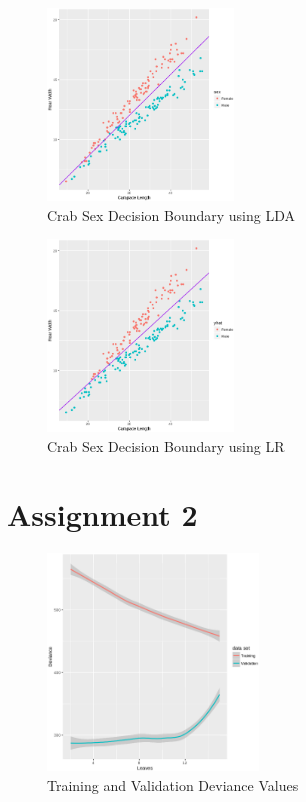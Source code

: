 \documentclass[a4paper, twocolumn]{article}
\begin{document}
        \begin{figure}[h!]
            \centering
            \caption{Crab Sex Decision Boundary using LDA}
            \label{fig:boundarylda}
            \includegraphics[width=0.44\textwidth]{share/boundarylda.eps}
        \end{figure}

        \begin{figure}[h!]
            \centering
            \caption{Crab Sex Decision Boundary using LR}
            \label{fig:boundarylr}
            \includegraphics[width=0.44\textwidth]{share/boundarylr.eps}
        \end{figure}

        \newpage

    \section*{Assignment 2}

        \begin{figure}[h!]
            \centering
            \caption{Training and Validation Deviance Values}
            \label{fig:deviance}
            \includegraphics[width=0.5\textwidth]{share/deviance.eps}
        \end{figure}
\end{document}
